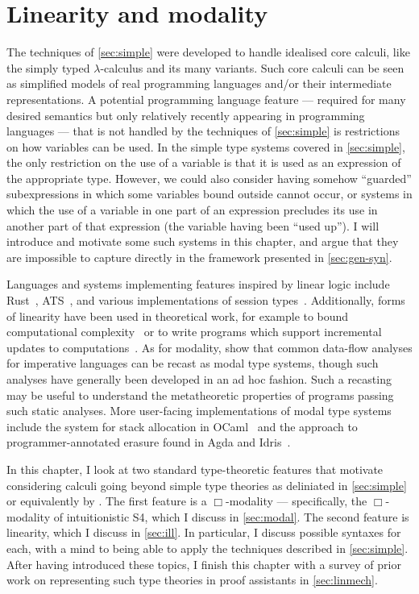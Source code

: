 \chapter{Linearity and modality}\label{sec:linearity}

The techniques of \cref{sec:simple} were developed to handle idealised core
calculi, like the simply typed $\lambda$-calculus and its many variants.
Such core calculi can be seen as simplified models of real programming languages
and/or their intermediate representations.
A potential programming language feature --- required for many desired semantics
but only relatively recently appearing in programming languages --- that is not
handled by the techniques of \cref{sec:simple} is restrictions on how variables
can be used.
In the simple type systems covered in \cref{sec:simple}, the only restriction on
the use of a variable is that it is used as an expression of the appropriate
type.
However, we could also consider having somehow ``guarded'' subexpressions in
which some variables bound outside cannot occur, or systems in which the use of
a variable in one part of an expression precludes its use in another part of
that expression (the variable having been ``used up'').
I will introduce and motivate some such systems in this chapter, and argue that
they are impossible to capture directly in the framework presented in
\cref{sec:gen-syn}.

Languages and systems implementing features inspired by linear logic include
Rust~\citep{MK14,Rust}, ATS~\citep{Xi04,ZX05}, and various implementations of
session types~\citep{HLVCCDMPRTVTZ16}.
Additionally, forms of linearity have been used in theoretical work, for example
to bound computational complexity~\citep{GSS92,Hofmann03} or to write programs
which support incremental updates to computations~\citep{ER03,Ehrhard18}.
As for modality, \citet{IMO20} show that common data-flow analyses for
imperative languages can be recast as modal type systems, though such analyses
have generally been developed in an ad hoc fashion.
Such a recasting may be useful to understand the metatheoretic properties of
programs passing such static analyses.
More user-facing implementations of modal type systems include the system for
stack allocation in OCaml~\citep{DW22} and the approach to programmer-annotated
erasure found in Agda and Idris~\citep{Atkey18}.

In this chapter, I look at two standard type-theoretic features that motivate
considering calculi going beyond simple type theories as deliniated in
\cref{sec:simple} or equivalently by \citet{AACMM21}.
The first feature is a $\Box$-modality --- specifically, the $\Box$-modality of
intuitionistic S4, which I discuss in \cref{sec:modal}.
The second feature is linearity, which I discuss in \cref{sec:ill}.
In particular, I discuss possible syntaxes for each, with a mind to
being able to apply the techniques described in \cref{sec:simple}.
After having introduced these topics, I finish this chapter with a survey of
prior work on representing such type theories in proof assistants in
\cref{sec:linmech}.

